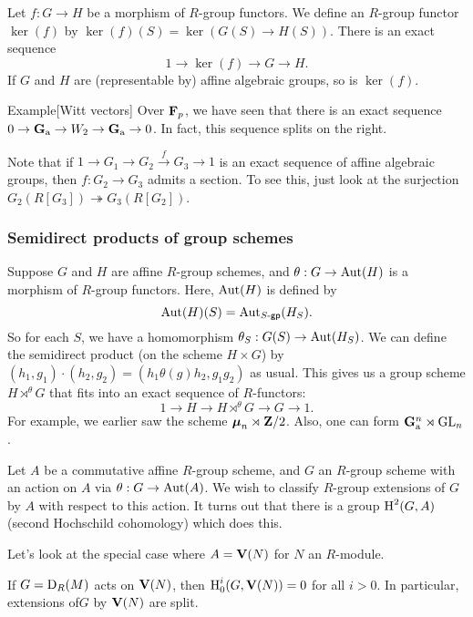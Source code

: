 Let $f:G\to H$ be a morphism of $R$-group functors. We define an $R$-group 
functor $\ker(f)$ by $\ker(f)(S)=\ker(G(S) \to H(S))$. There is an exact sequence 
\[
  1 \to \ker(f) \to G \to H .
\]
If $G$ and $H$ are (representable by) affine algebraic groups, so is $\ker(f)$. 

\begin{enonce}[remark]{Example}[Witt vectors]
Over $\mathbf{F}_p$, we have seen that there is an exact sequence 
$0 \to \mathbf{G}_{\mathrm{a}} \to W_2 \to \mathbf{G}_{\mathrm{a}} \to 0$. In fact, this sequence 
splits on the right. 
\end{enonce}

Note that if $1 \to G_1 \to G_2 \xrightarrow f G_3 \to 1$ is an exact 
sequence of affine algebraic groups, then $f:G_2 \to G_3$ admits a section. 
To see this, just look at the surjection 
$G_2(R[G_3]) \twoheadrightarrow G_3(R[G_2])$. 


\subsubsection{Semidirect products of group schemes}

Suppose $G$ and $H$ are affine $R$-group schemes, and 
$\theta:G\to \operatorname{Aut}(H)$ is a morphism of $R$-group functors. Here, 
$\operatorname{Aut}(H)$ is defined by 
\[
  \operatorname{Aut}(H)(S) = \operatorname{Aut}_{S\textnormal{-}\mathsf{gp}}(H_S) .
\]
So for each $S$, we have a homomorphism 
$\theta_S:G(S) \to \operatorname{Aut}(H_S)$. We can define the semidirect product 
(on the scheme $H\times G$) by 
$(h_1,g_1) \cdot (h_2,g_2) = (h_1 \theta(g) h_2, g_1 g_2)$ as usual. This 
gives us a group scheme $H\rtimes^\theta G$ that fits into an exact sequence of 
$R$-functors:
\[
  1 \to H \to H\rtimes^\theta G \to G \to 1 .
\]
For example, we earlier saw the scheme $\boldsymbol\mu_n\rtimes \mathbf{Z}/2$. Also, 
one can form $\mathbf{G}_{\mathrm{a}}^n\rtimes \operatorname{GL}_n$. 

Let $A$ be a commutative affine $R$-group scheme, and $G$ an $R$-group scheme 
with an action on $A$ via $\theta:G\to \operatorname{Aut}(A)$. We wish to classify 
$R$-group extensions of $G$ by $A$ with respect to this action. It turns out 
that there is a group $\operatorname{H}^2(G,A)$ (second Hochschild cohomology) which does this. 

Let's look at the special case where $A=\mathbf{V}(N)$ for $N$ an $R$-module. 

\begin{theo}[Grothendieck]
If $G=\operatorname{D}_R(M)$ acts on $\mathbf{V}(N)$, then $\operatorname{H}_0^i(G,\mathbf{V}(N))=0$ for all 
$i>0$. In particular, extensions of$G$ by $\mathbf{V}(N)$ are split. 
\end{theo}


